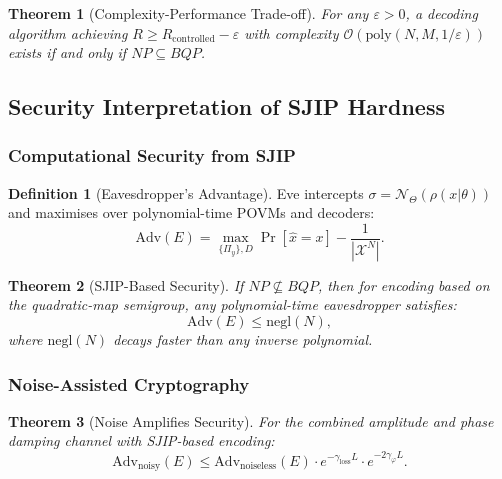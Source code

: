 \documentclass[12pt,a4paper]{article}
\theoremstyle{definition}
\newtheorem{definition}{Definition}[section]
\theoremstyle{plain}
\newtheorem{theorem}{Theorem}[section]
\begin{document}
\begin{theorem}[Complexity-Performance Trade-off]
For any $\varepsilon>0$, a decoding algorithm achieving $R\ge R_{\mathrm{controlled}}-\varepsilon$
with complexity $\mathcal{O}(\mathrm{poly}(N,M,1/\varepsilon))$ exists if and only if $NP\subseteq BQP$.
\end{theorem}

\subsection{Security Interpretation of SJIP Hardness}

\subsubsection{Computational Security from SJIP}

\begin{definition}[Eavesdropper's Advantage]
Eve intercepts $\sigma=\mathcal{N}_\Theta(\rho(x|\theta))$ and maximises over polynomial-time
POVMs and decoders:
\begin{equation}
\mathrm{Adv}(E)=\max_{\{\Pi_y\},D}\Pr[\hat{x}=x]-\frac{1}{|\mathcal{X}^N|}.
\end{equation}
\end{definition}

\begin{theorem}[SJIP-Based Security]
If $NP\not\subseteq BQP$, then for encoding based on the quadratic-map semigroup,
any polynomial-time eavesdropper satisfies:
\begin{equation}
\mathrm{Adv}(E)\le\mathrm{negl}(N),
\end{equation}
where $\mathrm{negl}(N)$ decays faster than any inverse polynomial.
\end{theorem}

\subsubsection{Noise-Assisted Cryptography}

\begin{theorem}[Noise Amplifies Security]
For the combined amplitude and phase damping channel with SJIP-based encoding:
\begin{equation}
\mathrm{Adv}_{\mathrm{noisy}}(E)\le\mathrm{Adv}_{\mathrm{noiseless}}(E)\cdot e^{-\gamma_{\mathrm{loss}}L}\cdot e^{-2\gamma_\varphi L}.
\label{eq:noise_security}
\end{equation}
\end{theorem}
\end{document}
